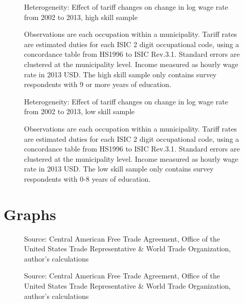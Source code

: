 \documentclass[12pt]{article}
\begin{document}
\begin{landscape}
\begin{figure}[H]
\begin{center}
Heterogeneity: Effect of tariff changes on change in log wage rate from 2002 to 2013, high skill sample

\caption{\label{fig:Table4}}
\end{center}
Observations are each occupation within a municipality.
Tariff rates are estimated duties for each ISIC 2 digit occupational code,
using a concordance table from HS1996 to ISIC Rev.3.1. Standard errors are clustered at the 
municipality level. Income measured as hourly wage rate in 2013 USD. The high skill sample only 
contains survey respondents with 9 or more years of education.
\end{figure}

\begin{figure}[H]
\begin{center}
Heterogeneity: Effect of tariff changes on change in log wage rate from 2002 to 2013, low skill sample

\caption{\label{fig:Table5}}
\end{center}
Observations are each occupation within a municipality. 
Tariff rates are estimated duties for each ISIC 2 digit occupational code,
using a concordance table from HS1996 to ISIC Rev.3.1. Standard errors are clustered at the 
municipality level. Income measured as hourly wage rate in 2013 USD. The low skill sample only 
contains survey respondents with 0-8 years of education.
\end{figure}
\end{landscape}

\section{Graphs}
\label{sec:Graphs}

\begin{figure}[H]
 
\caption{\label{fig:Graph1}}
Source: Central American Free Trade Agreement, Office of the United States Trade Representative \&
World Trade Organization, author's calculations
\end{figure}

\begin{figure}[H]

\caption{\label{fig:Graph2}}
Source: Central American Free Trade Agreement, Office of the United States Trade Representative \&
World Trade Organization, author's calculations
\end{figure}
\end{document}
